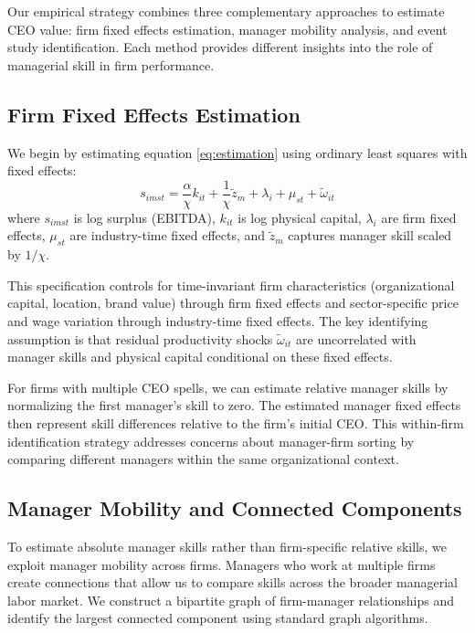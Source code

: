\documentclass[11pt,a4paper]{article}
\begin{document}
Our empirical strategy combines three complementary approaches to estimate CEO value: firm fixed effects estimation, manager mobility analysis, and event study identification. Each method provides different insights into the role of managerial skill in firm performance.

\subsection{Firm Fixed Effects Estimation}

We begin by estimating equation \eqref{eq:estimation} using ordinary least squares with fixed effects:
\begin{equation}
s_{imst} = \frac{\alpha}{\chi} k_{it} + \frac{1}{\chi}\tilde{z}_m + \lambda_i + \mu_{st} + \tilde{\omega}_{it}
\end{equation}
where $s_{imst}$ is log surplus (EBITDA), $k_{it}$ is log physical capital, $\lambda_i$ are firm fixed effects, $\mu_{st}$ are industry-time fixed effects, and $\tilde{z}_m$ captures manager skill scaled by $1/\chi$.

This specification controls for time-invariant firm characteristics (organizational capital, location, brand value) through firm fixed effects and sector-specific price and wage variation through industry-time fixed effects. The key identifying assumption is that residual productivity shocks $\tilde{\omega}_{it}$ are uncorrelated with manager skills and physical capital conditional on these fixed effects.

For firms with multiple CEO spells, we can estimate relative manager skills by normalizing the first manager's skill to zero. The estimated manager fixed effects then represent skill differences relative to the firm's initial CEO. This within-firm identification strategy addresses concerns about manager-firm sorting by comparing different managers within the same organizational context.

\subsection{Manager Mobility and Connected Components}

To estimate absolute manager skills rather than firm-specific relative skills, we exploit manager mobility across firms. Managers who work at multiple firms create connections that allow us to compare skills across the broader managerial labor market. We construct a bipartite graph of firm-manager relationships and identify the largest connected component using standard graph algorithms.
\end{document}

